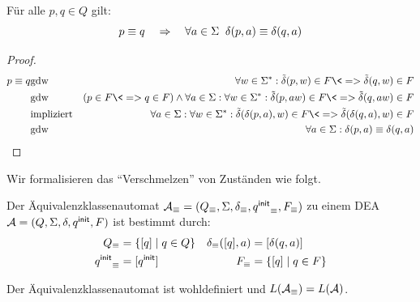 
\begin{lemma}
\label{eqn:delta-wohldefiniert}
Für alle $p,q\in Q$ gilt:
        $$p \equiv q \quad\=>\quad \forall a\in\Sigma\;\; \delta(p,a)\equiv\delta(q,a)$$
\end{lemma}
\begin{proof}
\begin{eqnarray*}
        p \equiv q  
        & \text{gdw} & \forall w\in\Sigma^*: \tilde\delta(p,w)\in F \<=> \tilde\delta(q,w) \in F\\
        & \text{gdw} & (p\in F \<=> q \in F) \land \forall a\in \Sigma: \forall w\in\Sigma^*:
        \tilde\delta(p,aw)\in F \<=> \tilde\delta(q,aw)\in F\\
        &\text{impliziert} &  \forall a\in\Sigma: \forall w\in\Sigma^*: \tilde\delta(\delta(p,a),w)\in F \<=> \tilde\delta(\delta(q,a),w)\in F\\
        & \text{gdw} & \forall a\in\Sigma: \delta(p,a)\equiv\delta(q,a)
\end{eqnarray*}
\end{proof}
Wir formalisieren das ``Verschmelzen'' von Zuständen wie folgt.
\begin{Def}[name={[Äquivalenzklassenautomat]}]
        Der Äquivalenzklassenautomat $\mathcal{A}_\equiv=(Q_\equiv,\Sigma,\delta_\equiv,{{q^\mathsf{init}}}_\equiv,F_\equiv)$ zu einem DEA $\mathcal{A}=(Q,\Sigma,\delta,{q^\mathsf{init}},F)$ ist bestimmt durch:
        \begin{align*}
                Q_\equiv &= \{[q]\mid q\in Q\} & \delta_\equiv([q],a) &= [\delta(q,a)]\\
                {q^\mathsf{init}}_\equiv &= [{q^\mathsf{init}}] & F_\equiv & =\{[q]\mid q\in F \}
        \end{align*}
\end{Def}
\begin{Satz}[name={[Äquivalenzklassenautomat ist wohldefiniert]}]
        Der Äquivalenzklassenautomat ist wohldefiniert und $L(\mathcal{A}_\equiv)=L(\mathcal{A})$.
\end{Satz}

